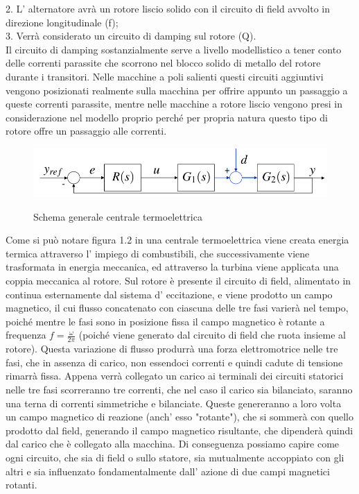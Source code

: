 \documentclass[Lau,noexaminfo]{sapthesis}
\begin{document}
	2. L' alternatore avrà un rotore liscio solido con il circuito di field avvolto in \\ \qquad direzione longitudinale (f);\\
	3. Verrà considerato un circuito di damping sul rotore (Q).\\
	Il circuito di damping sostanzialmente serve a livello modellistico a tener conto delle correnti parassite che scorrono nel blocco solido di metallo del rotore durante i transitori. Nelle macchine a poli salienti questi circuiti aggiuntivi vengono posizionati realmente sulla macchina per offrire appunto un passaggio a queste correnti parassite, mentre nelle macchine a rotore liscio vengono presi in considerazione nel modello proprio perché per propria natura questo tipo di rotore offre un passaggio alle correnti.
	\begin{figure}
		\centering
		\includegraphics[height=0.3\textheight]{schema_generale}\\
		\caption{Schema generale centrale termoelettrica}
	\end{figure}
	Come si può notare figura 1.2 in una centrale termoelettrica viene creata energia termica attraverso l' impiego di combustibili, che successivamente viene trasformata in energia meccanica, ed attraverso la turbina viene applicata una coppia meccanica al rotore. Sul rotore è presente il circuito di field, alimentato in continua esternamente dal sistema d' eccitazione, e viene prodotto un campo magnetico, il cui flusso concatenato con ciascuna delle tre fasi varierà nel tempo, poiché mentre le fasi sono in posizione fissa il campo magnetico è rotante a frequenza $f=\frac{\omega}{2\pi}$ (poiché viene generato dal circuito di field che ruota insieme al rotore). Questa variazione di flusso produrrà una forza elettromotrice nelle tre fasi, che in assenza di carico, non essendoci correnti e quindi cadute di tensione rimarrà fissa. Appena verrà collegato un carico ai terminali dei circuiti statorici nelle tre fasi scorreranno tre correnti, che nel caso il carico sia bilanciato, saranno una terna di correnti simmetriche e bilanciate. Queste genereranno a loro volta un campo magnetico di reazione (anch' esso "rotante"), che si sommerà con quello prodotto dal field, generando il campo magnetico risultante, che dipenderà quindi dal carico che è collegato alla macchina. Di conseguenza possiamo capire come ogni circuito, che sia di field o sullo statore, sia mutualmente accoppiato con gli altri e sia influenzato fondamentalmente dall' azione di due campi magnetici rotanti.
\end{document}
